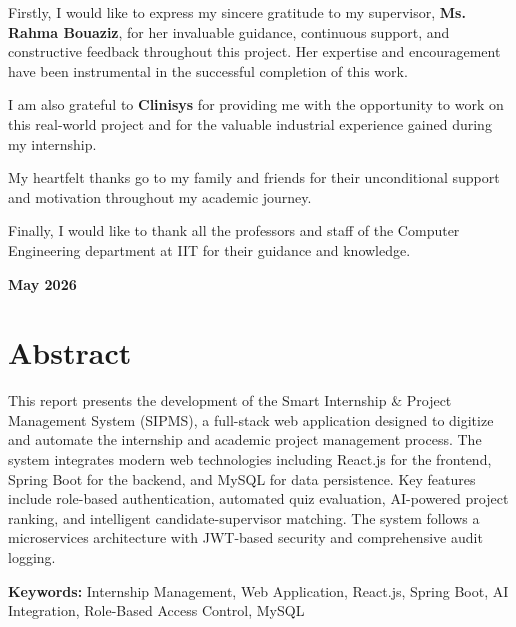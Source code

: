 \documentclass[12pt,a4paper]{report}
\begin{document}
Firstly, I would like to express my sincere gratitude to my supervisor, \textbf{Ms. Rahma Bouaziz}, for her invaluable guidance, continuous support, and constructive feedback throughout this project. Her expertise and encouragement have been instrumental in the successful completion of this work.

I am also grateful to \textbf{Clinisys} for providing me with the opportunity to work on this real-world project and for the valuable industrial experience gained during my internship.

My heartfelt thanks go to my family and friends for their unconditional support and motivation throughout my academic journey.

Finally, I would like to thank all the professors and staff of the Computer Engineering department at IIT for their guidance and knowledge.

\vspace{2cm}
\textbf{May 2026}

\chapter*{Abstract}

This report presents the development of the Smart Internship \& Project Management System (SIPMS), a full-stack web application designed to digitize and automate the internship and academic project management process. The system integrates modern web technologies including React.js for the frontend, Spring Boot for the backend, and MySQL for data persistence. Key features include role-based authentication, automated quiz evaluation, AI-powered project ranking, and intelligent candidate-supervisor matching. The system follows a microservices architecture with JWT-based security and comprehensive audit logging.

\textbf{Keywords:} Internship Management, Web Application, React.js, Spring Boot, AI Integration, Role-Based Access Control, MySQL

\tableofcontents
{}

\listoffigures
{}
\end{document}
